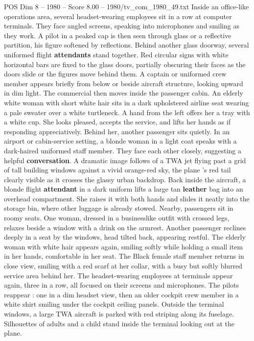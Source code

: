 \begin{textsample}{POS Dim 8 – 1980 – Score 8.00 – 1980/tv\_com\_1980\_49.txt}
Inside an office-like operations area, several headset-wearing employees sit in a row at computer terminals.
They face angled screens, speaking into microphones and smiling as they work.
A pilot in a peaked cap is then seen through glass or a reflective partition, his figure softened by reflections.
Behind another glass doorway, several uniformed flight \textbf{attendants} stand together.
Red circular signs with white horizontal bars are fixed to the glass doors, partially obscuring their faces as the doors slide or the figures move behind them.
A captain or uniformed crew member appears briefly from below or beside aircraft structure, looking upward in dim light.
The commercial then moves inside the passenger cabin.
An elderly white woman with short white hair sits in a dark upholstered airline seat wearing a pale sweater over a white turtleneck.
A hand from the left offers her a tray with a white cup.
She looks pleased, accepts the service, and lifts her hands as if responding appreciatively.
Behind her, another passenger sits quietly.
In an airport or cabin-service setting, a blonde woman in a light coat speaks with a dark-haired uniformed staff member.
They face each other closely, suggesting a helpful \textbf{conversation}.
A dramatic image follows of a TWA jet flying past a grid of tall building windows against a vivid orange-red sky, the plane ’s red tail clearly visible as it crosses the glassy urban backdrop.
Back inside the aircraft, a blonde flight \textbf{attendant} in a dark uniform lifts a large tan \textbf{leather} bag into an overhead compartment.
She raises it with both hands and slides it neatly into the storage bin, where other luggage is already stowed.
Nearby, passengers sit in roomy seats.
One woman, dressed in a businesslike outfit with crossed legs, relaxes beside a window with a drink on the armrest.
Another passenger reclines deeply in a seat by the windows, head tilted back, appearing restful.
The elderly woman with white hair appears again, smiling softly while holding a small item in her hands, comfortable in her seat.
The Black female staff member returns in close view, smiling with a red scarf at her collar, with a busy but softly blurred service area behind her.
The headset-wearing employees at terminals appear again, three in a row, all focused on their screens and microphones.
The pilots reappear : one in a dim headset view, then an older cockpit crew member in a white shirt smiling under the cockpit ceiling panels.
Outside the terminal windows, a large TWA aircraft is parked with red striping along its fuselage.
Silhouettes of adults and a child stand inside the terminal looking out at the plane.

\end{textsample}
